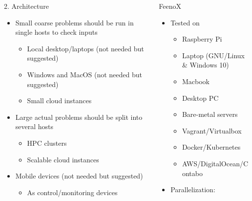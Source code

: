\documentclass[
  ignorenonframetext,
  aspectratio=169,
]{beamer}
\providecommand{\tightlist}{%
  \setlength{\itemsep}{0pt}\setlength{\parskip}{0pt}}
\begin{document}
\begin{frame}{}
\protect\hypertarget{section-4}{}
\begin{columns}[T]
\begin{column}{0.5\textwidth}
\begin{block}{2. Architecture}
\protect\hypertarget{architecture-1}{}
\begin{itemize}
\tightlist
\item
  Small coarse problems should be run in single hosts to check inputs

  \begin{itemize}
  \tightlist
  \item
    Local desktop/laptops (not needed but suggested)
  \item
    Windows and MacOS (not needed but suggested)
  \item
    Small cloud instances
  \end{itemize}
\item
  Large actual problems should be split into several hosts

  \begin{itemize}
  \tightlist
  \item
    HPC clusters
  \item
    Scalable cloud instances
  \end{itemize}
\item
  Mobile devices (not needed but suggested)

  \begin{itemize}
  \tightlist
  \item
    As control/monitoring devices
  \end{itemize}
\end{itemize}
\end{block}
\end{column}

\pause

\begin{column}{0.5\textwidth}
\begin{exampleblock}{FeenoX}
\protect\hypertarget{feenox-3}{}
\begin{itemize}
\item
  Tested on

  \begin{itemize}
  \tightlist
  \item
    Raspberry Pi
  \item
    Laptop (GNU/Linux \& Windows 10)
  \item
    Macbook
  \item
    Desktop PC
  \item
    Bare-metal servers
  \item
    Vagrant/Virtualbox
  \item
    Docker/Kubernetes
  \item
    AWS/DigitalOcean/Contabo
  \end{itemize}
\item
  Parallelization:


\end{itemize}
\end{exampleblock}
\end{column}
\end{columns}
\end{frame}
\end{document}
